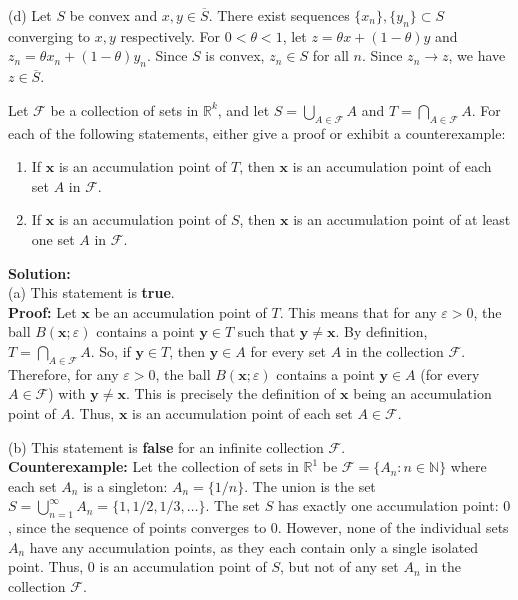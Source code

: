 (d) Let $S$ be convex and $x, y \in \overline{S}$. There exist sequences $\{x_n\}, \{y_n\} \subset S$ converging to $x, y$ respectively. For $0 < \theta < 1$, let $z = \theta x + (1-\theta)y$ and $z_n = \theta x_n + (1-\theta)y_n$. Since $S$ is convex, $z_n \in S$ for all $n$. Since $z_n \to z$, we have $z \in \overline{S}$.

\begin{problembox}            
Let $\mathcal{F}$ be a collection of sets in $\mathbb{R}^k$, and let $S = \bigcup_{A \in \mathcal{F}} A$ and $T = \bigcap_{A \in \mathcal{F}} A$. For each of the following statements, either give a proof or exhibit a counterexample:
\begin{enumerate}[label=\alph*)]
\item If $\mathbf{x}$ is an accumulation point of $T$, then $\mathbf{x}$ is an accumulation point of each set $A$ in $\mathcal{F}$.
\item If $\mathbf{x}$ is an accumulation point of $S$, then $\mathbf{x}$ is an accumulation point of at least one set $A$ in $\mathcal{F}$.
\end{enumerate}
\end{problembox}

\textbf{Solution:}\\
(a) This statement is \textbf{true}.\\
\textbf{Proof:} Let $\mathbf{x}$ be an accumulation point of $T$. This means that for any $\varepsilon > 0$, the ball $B(\mathbf{x}; \varepsilon)$ contains a point $\mathbf{y} \in T$ such that $\mathbf{y} \neq \mathbf{x}$. By definition, $T = \bigcap_{A \in \mathcal{F}} A$. So, if $\mathbf{y} \in T$, then $\mathbf{y} \in A$ for every set $A$ in the collection $\mathcal{F}$. Therefore, for any $\varepsilon > 0$, the ball $B(\mathbf{x}; \varepsilon)$ contains a point $\mathbf{y} \in A$ (for every $A \in \mathcal{F}$) with $\mathbf{y} \neq \mathbf{x}$. This is precisely the definition of $\mathbf{x}$ being an accumulation point of $A$. Thus, $\mathbf{x}$ is an accumulation point of each set $A \in \mathcal{F}$.

(b) This statement is \textbf{false} for an infinite collection $\mathcal{F}$.\\
\textbf{Counterexample:} Let the collection of sets in $\mathbb{R}^1$ be $\mathcal{F} = \{A_n : n \in \mathbb{N}\}$ where each set $A_n$ is a singleton: $A_n = \{1/n\}$.
The union is the set $S = \bigcup_{n=1}^{\infty} A_n = \{1, 1/2, 1/3, \dots\}$.
The set $S$ has exactly one accumulation point: $0$, since the sequence of points converges to $0$.
However, none of the individual sets $A_n$ have any accumulation points, as they each contain only a single isolated point.
Thus, $0$ is an accumulation point of $S$, but not of any set $A_n$ in the collection $\mathcal{F}$.

